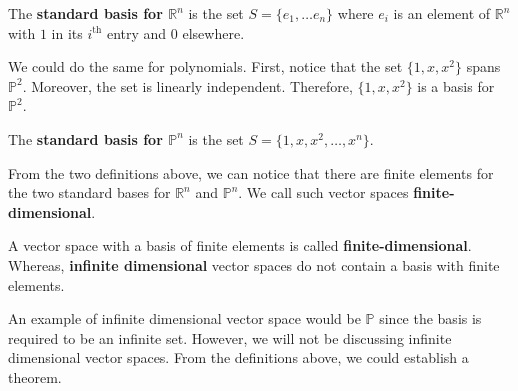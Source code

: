 \documentclass[../main.tex]{subfiles}
\begin{document}
\begin{definition}
The \textbf{standard basis for $\mathbb{R}^n$} is the set $S =
\{ e_1, \ldots e_n \}$ where $e_i$ is an element of $\mathbb{R}^n$
with $1$ in its $i^\text{th}$ entry and $0$ elsewhere.
\end{definition}

We could do the same for polynomials. First, notice that the set
$\{ 1, x, x^2 \}$ spans $\mathbb{P}^2$. Moreover, the set is linearly
independent. Therefore, $\{ 1, x, x^2 \}$ is a basis for
$\mathbb{P}^2$.

\begin{definition}
The \textbf{standard basis for $\mathbb{P}^n$} is the set $S =
\{ 1, x, x^2, \ldots, x^n \}$.
\end{definition}

From the two definitions above, we can notice that there are finite
elements for the two standard bases for $\mathbb{R}^n$ and
$\mathbb{P}^n$. We call such vector spaces
\textbf{finite-dimensional}.

\begin{definition}
A vector space with a basis of finite elements is called
\textbf{finite-dimensional}. Whereas, \textbf{infinite dimensional}
vector spaces do not contain a basis with finite elements.
\end{definition}

An example of infinite dimensional vector space would be $\mathbb{P}$
since the basis is required to be an infinite set. However, we will
not be discussing infinite dimensional vector spaces. From the
definitions above, we could establish a theorem.
\end{document}
